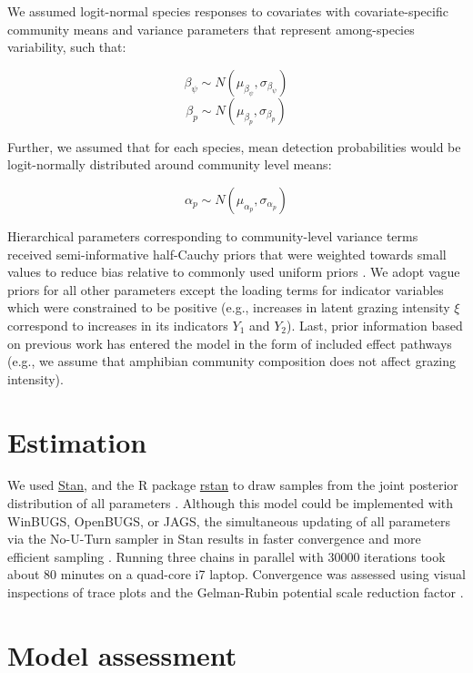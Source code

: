 We assumed logit-normal species responses to covariates with
covariate-specific community means and variance parameters that
represent among-species variability, such that:

\[ \beta_{\psi} \sim N(\mu_{\beta_{\psi}}, \sigma_{\beta_{\psi}}) \]
\[ \beta_{p} \sim N(\mu_{\beta_{p}}, \sigma_{\beta_{p}}) \]

Further, we assumed that for each species, mean detection probabilities
would be logit-normally distributed around community level means:

\[ \alpha_{p} \sim N(\mu_{\alpha_{p}}, \sigma_{\alpha_{p}}) \]

Hierarchical parameters corresponding to community-level variance terms
received semi-informative half-Cauchy priors that were weighted towards
small values to reduce bias relative to commonly used uniform priors
\citep{gelman2006}. We adopt vague priors for all other parameters except the
loading terms for indicator variables which were constrained to be
positive (e.g., increases in latent grazing intensity $\xi$ correspond
to increases in its indicators $Y_1$ and $Y_2$). Last, prior information
based on previous work has entered the model in the form of included
effect pathways (e.g., we assume that amphibian community composition
does not affect grazing intensity).

\section{Estimation}

We used \href{http://mc-stan.org/}{Stan}, and the R package
\href{http://mc-stan.org/rstan.html}{rstan} to draw samples from the
joint posterior distribution of all parameters \citep{stan-manual:2014, R2014, rstan-software:2014, stan-software:2014}.
Although this model could be
implemented with WinBUGS, OpenBUGS, or JAGS, the simultaneous updating
of all parameters via the No-U-Turn sampler in Stan results in faster
convergence and more efficient sampling \citep{Hoffman2014}.
Running three chains in parallel with 30000 iterations took about 80
minutes on a quad-core i7 laptop. Convergence was assessed using visual
inspections of trace plots and the Gelman-Rubin potential scale
reduction factor \citep{Gelman1992, Brooks1998}.

\section{Model assessment}

